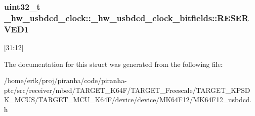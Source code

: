\subsubsection[{\texorpdfstring{R\+E\+S\+E\+R\+V\+E\+D1}{RESERVED1}}]{\setlength{\rightskip}{0pt plus 5cm}uint32\+\_\+t \+\_\+hw\+\_\+usbdcd\+\_\+clock\+::\+\_\+hw\+\_\+usbdcd\+\_\+clock\+\_\+bitfields\+::\+R\+E\+S\+E\+R\+V\+E\+D1}\hypertarget{struct__hw__usbdcd__clock_1_1__hw__usbdcd__clock__bitfields_a83a381c9b6ce7de87ea7f6b4a76911f0}{}\label{struct__hw__usbdcd__clock_1_1__hw__usbdcd__clock__bitfields_a83a381c9b6ce7de87ea7f6b4a76911f0}
\mbox{[}31\+:12\mbox{]} 

The documentation for this struct was generated from the following file\+:\begin{DoxyCompactItemize}
\item 
/home/erik/proj/piranha/code/piranha-\/ptc/src/receiver/mbed/\+T\+A\+R\+G\+E\+T\+\_\+\+K64\+F/\+T\+A\+R\+G\+E\+T\+\_\+\+Freescale/\+T\+A\+R\+G\+E\+T\+\_\+\+K\+P\+S\+D\+K\+\_\+\+M\+C\+U\+S/\+T\+A\+R\+G\+E\+T\+\_\+\+M\+C\+U\+\_\+\+K64\+F/device/device/\+M\+K64\+F12/M\+K64\+F12\+\_\+usbdcd.\+h\end{DoxyCompactItemize}
